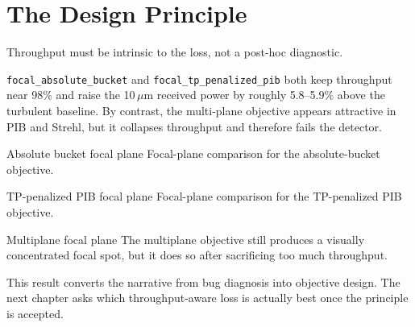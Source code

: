 \section{The Design Principle}

\begin{breakthrough}
Throughput must be intrinsic to the loss, not a post-hoc diagnostic.
\end{breakthrough}

\texttt{focal\_absolute\_bucket} and \texttt{focal\_tp\_penalized\_pib} both keep throughput near
98\% and raise the 10\,$\mu$m received power by roughly 5.8--5.9\% above the
turbulent baseline. By contrast, the multi-plane objective appears attractive in
PIB and Strehl, but it collapses throughput and therefore fails the detector.

  {Absolute bucket focal plane}
  {Focal-plane comparison for the absolute-bucket objective.}

  {TP-penalized PIB focal plane}
  {Focal-plane comparison for the TP-penalized PIB objective.}

  {Multiplane focal plane}
  {The multiplane objective still produces a visually concentrated focal spot,
  but it does so after sacrificing too much throughput.}

This result converts the narrative from bug diagnosis into objective design. The
next chapter asks which throughput-aware loss is actually best once the
principle is accepted.
